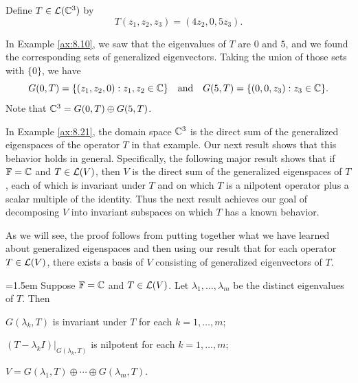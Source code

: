 \begin{example}\label{ax:8.21}
Define $T\in\mathcal{L}(\mathbb{C}^3)$ by
\[ T(z_1,z_2,z_3) = (4z_2,0,5z_3). \]

In Example \ref{ax:8.10}, we saw that the eigenvalues of $T$ are $0$ and $5$,
and we found the corresponding sets of generalized eigenvectors. Taking the
union of those sets with $\{0\}$, we have
\[ G(0,T) = \{(z_1,z_2,0) : z_1,z_2\in\mathbb{C}\} \quad\text{and}\quad
   G(5,T) = \{(0,0,z_3) : z_3\in\mathbb{C}\}. \]
Note that $\mathbb{C}^3=G(0,T)\oplus G(5,T)$.
\end{example}

In Example \ref{ax:8.21}, the domain space $\mathbb{C}^3$ is the direct sum of the
generalized eigenspaces of the operator $T$ in that example. Our next result
shows that this behavior holds in general. Specifically, the following major
result shows that if $\mathbb{F}=\mathbb{C}$ and $T\in\mathcal{L}(V)$, then $V$ is the direct sum of
the generalized eigenspaces of $T$, each of which is invariant under $T$ and on
which $T$ is a nilpotent operator plus a scalar multiple of the identity. Thus
the next result achieves our goal of decomposing $V$ into invariant subspaces on
which $T$ has a known behavior.

As we will see, the proof follows from putting together what we have learned
about generalized eigenspaces and then using our result that for each operator
$T\in\mathcal{L}(V)$, there exists a basis of $V$ consisting of generalized
eigenvectors of $T$.

\begin{result}\label{ax:8.22}\emergencystretch=1.5em
Suppose $\mathbb{F}=\mathbb{C}$ and $T\in\mathcal{L}(V)$. Let $\lambda_1,\dots,\lambda_m$ be the
distinct eigenvalues of $T$. Then
\begin{parts}
\item $G(\lambda_k,T)$ is invariant under $T$ for each $k=1,\dots,m$;
\item $(T-\lambda_kI)|_{G(\lambda_k,T)}$ is nilpotent for each
  $k=1,\dots,m$;
\item $V=G(\lambda_1,T)\oplus\cdots\oplus G(\lambda_m,T)$.
\end{parts}
\end{result}

